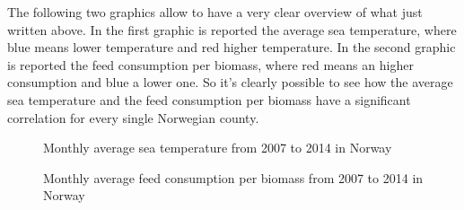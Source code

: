 \newpage

The following two graphics allow to have a very clear overview of what just written above.
In the first graphic is reported the average sea temperature, where blue means lower temperature and red higher temperature. In the second graphic is reported the feed consumption per biomass, where red means an higher consumption and blue a lower one.
So it's clearly possible to see how the average sea temperature and the feed consumption per biomass have a significant correlation for every single Norwegian county.
\begin{figure}[H]
    \caption{Monthly average sea temperature from 2007 to 2014 in Norway}
    \label{fig: Norway_averageSeaTemp}
\end{figure}

\begin{figure}[H]
    \caption{Monthly average feed consumption per biomass from 2007 to 2014 in Norway}
    \label{fig: Norway_feed-biomass}
\end{figure}

\newpage

